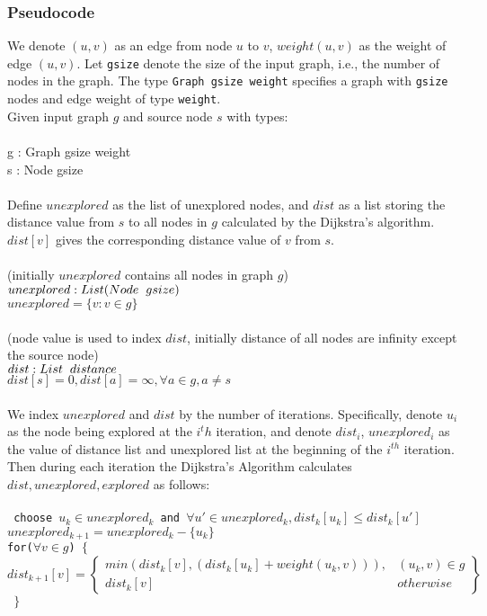 
\subsubsection{Pseudocode}
We denote $(u, v)$ as an edge from node $u$ to $v$, $weight(u, v)$ as the weight of edge $(u, v)$. Let \texttt{gsize} denote the size of the input graph, i.e., the number of nodes in the graph. The type \texttt{Graph gsize weight} specifies a graph with \texttt{gsize} nodes and edge weight of type \texttt{weight}. 
\\
Given input graph $g$ and source node $s$ with types:
\\\\
  \tab g : Graph gsize weight\\
  \tab s : Node gsize
\\\\
Define $unexplored$ as the list of unexplored nodes, and $dist$ as a list storing the distance value from $s$ to all nodes in $g$ calculated by the Dijkstra's algorithm. $dist[v]$ gives the corresponding distance value of $v$ from $s$.
\\\\
\tab (initially $unexplored$ contains all nodes in graph $g$)\\
\tab $unexplored : List (Node \hspace*{0.2cm} gsize)$\\
\tab $unexplored = \{v : v \in g\}$
\\\\
\tab (node value is used to index $dist$, initially distance of all nodes are infinity except 
\\ \tab the source node)\\
\tab $dist : List \hspace*{0.2cm} distance$ \\
\tab $dist[s] = 0, dist[a] = \infty, \forall a \in g, a \neq s$
\\\\
We index $unexplored$ and $dist$ by the number of iterations. Specifically, denote $u_i$ as the node being explored at the $i^th$ iteration, and denote $dist_i$, $unexplored_i$ as the value of distance list and unexplored list at the beginning of the $i^{th}$ iteration. Then during each iteration the Dijkstra's Algorithm calculates $dist, unexplored, explored$ as follows:
\\\\
\texttt{
  \tab\tab choose $u_k \in unexplored_k$ and $\forall u' \in unexplored_k, dist_k[u_k] \leq dist_k[u']$ \\
  \tab\tab $unexplored_{k+1} = unexplored_k - \{u_k\}$                    \\
  \tab\tab for($\forall v \in g$) $\{$
  \tab\[
        dist_{k+1}[v] = \left.
       \begin{cases} 
          min(dist_k[v], (dist_k[u_k] + weight(u_k,v))), & (u_k,v) \in g \\ 
          dist_k[v] & otherwise 
        \end{cases}
        \right\}
      \]
  \tab\tab $\}$ \\
}
